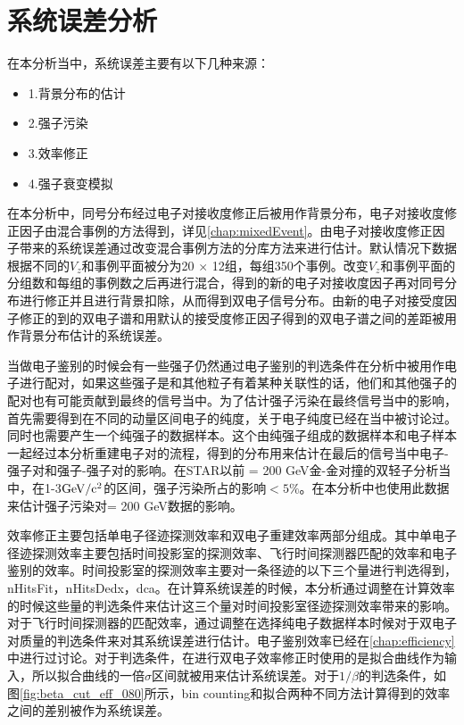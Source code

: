 \section{系统误差分析}

在本分析当中，系统误差主要有以下几种来源：
\begin{itemize}
    \item 1.背景分布的估计
    \item 2.强子污染
    \item 3.效率修正
    \item 4.强子衰变模拟
\end{itemize}

在本分析中，同号分布经过电子对接收度修正后被用作背景分布，电子对接收度修正因子由混合事例的方法得到，详见\ref{chap:mixedEvent}。由电子对接收度修正因子带来的系统误差通过改变混合事例方法的分库方法来进行估计。默认情况下数据根据不同的$V_z$和事例平面被分为20 $\times$ 12组，每组350个事例。改变$V_z$和事例平面的分组数和每组的事例数之后再进行混合，得到的新的电子对接收度因子再对同号分布进行修正并且进行背景扣除，从而得到双电子信号分布。由新的电子对接受度因子修正的到的双电子谱和用默认的接受度修正因子得到的双电子谱之间的差距被用作背景分布估计的系统误差。

当做电子鉴别的时候会有一些强子仍然通过电子鉴别的判选条件在分析中被用作电子进行配对，如果这些强子是和其他粒子有着某种关联性的话，他们和其他强子的配对也有可能贡献到最终的信号当中。为了估计强子污染在最终信号当中的影响，首先需要得到在不同的动量区间电子的纯度，关于电子纯度已经在当中被讨论过。同时也需要产生一个纯强子的数据样本。这个由纯强子组成的数据样本和电子样本一起经过本分析重建电子对的流程，得到的分布用来估计在最后的信号当中电子-强子对和强子-强子对的影响。在STAR以前 \sNN = 200 GeV金-金对撞的双轻子分析当中，在1-3${\rm GeV/c^2}$的区间，强子污染所占的影响$<5\%$。在本分析中也使用此数据来估计强子污染对\sNN = 200 GeV数据的影响。

效率修正主要包括单电子径迹探测效率和双电子重建效率两部分组成。其中单电子径迹探测效率主要包括时间投影室的探测效率、飞行时间探测器匹配的效率和电子鉴别的效率。时间投影室的探测效率主要对一条径迹的以下三个量进行判选得到，nHitsFit，nHitsDedx，dca。在计算系统误差的时候，本分析通过调整在计算效率的时候这些量的判选条件来估计这三个量对时间投影室径迹探测效率带来的影响。对于飞行时间探测器的匹配效率，通过调整在选择纯电子数据样本时候对于双电子对质量的判选条件来对其系统误差进行估计。电子鉴别效率已经在\ref{chap:efficiency}中进行过讨论。对于\nSigmaE 判选条件，在进行双电子效率修正时使用的是拟合曲线作为输入，所以拟合曲线的一倍$\sigma$区间就被用来估计系统误差。对于$1/\beta$的判选条件，如图\ref{fig:beta_cut_eff_080}所示，bin counting和拟合两种不同方法计算得到的效率之间的差别被作为系统误差。

